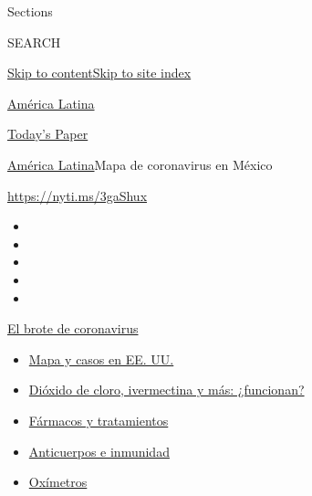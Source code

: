 Sections

SEARCH

\protect\hyperlink{site-content}{Skip to
content}\protect\hyperlink{site-index}{Skip to site index}

\href{https://www.nytimes.com/es/section/america-latina}{América Latina}

\href{https://myaccount.nytimes.com/auth/login?response_type=cookie\&client_id=vi}{}

\href{https://www.nytimes.com/section/todayspaper}{Today's Paper}

\href{/es/section/america-latina}{América Latina}\textbar{}Mapa de
coronavirus en México

\url{https://nyti.ms/3gaShux}

\begin{itemize}
\item
\item
\item
\item
\item
\end{itemize}

\href{https://www.nytimes.com/es/spotlight/coronavirus?action=click\&pgtype=Article\&state=default\&region=TOP_BANNER\&context=storylines_menu}{El
brote de coronavirus}

\begin{itemize}
\tightlist
\item
  \href{https://www.nytimes.com/es/interactive/2020/espanol/mundo/coronavirus-en-estados-unidos.html?action=click\&pgtype=Article\&state=default\&region=TOP_BANNER\&context=storylines_menu}{Mapa
  y casos en EE. UU.}
\item
  \href{https://www.nytimes.com/es/2020/07/23/espanol/america-latina/bolivia-cloro-coronavirus-ivermectina.html?action=click\&pgtype=Article\&state=default\&region=TOP_BANNER\&context=storylines_menu}{Dióxido
  de cloro, ivermectina y más: ¿funcionan?}
\item
  \href{https://www.nytimes.com/es/interactive/2020/science/coronavirus-tratamientos-curas.html?action=click\&pgtype=Article\&state=default\&region=TOP_BANNER\&context=storylines_menu}{Fármacos
  y tratamientos}
\item
  \href{https://www.nytimes.com/es/2020/07/28/espanol/ciencia-y-tecnologia/anticuerpos-coronavirus-inmunidad.html?action=click\&pgtype=Article\&state=default\&region=TOP_BANNER\&context=storylines_menu}{Anticuerpos
  e inmunidad}
\item
  \href{https://www.nytimes.com/es/2020/04/29/espanol/estilos-de-vida/oximetro-para-que-sirve.html?action=click\&pgtype=Article\&state=default\&region=TOP_BANNER\&context=storylines_menu}{Oxímetros}
\end{itemize}

